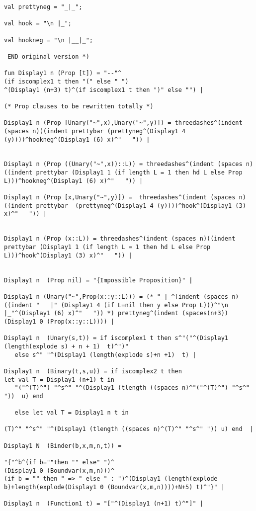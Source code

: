 \documentclass{article}
\begin{document}
{{\begin{verbatim}
val prettyneg = "_|_";

val hook = "\n |_";

val hookneg = "\n |__|_";

 END original version *)

fun Display1 n (Prop [t]) = "--"^
(if iscomplex1 t then "(" else " ")
^(Display1 (n+3) t)^(if iscomplex1 t then ")" else "") |

(* Prop clauses to be rewritten totally *)

Display1 n (Prop [Unary("~",x),Unary("~",y)]) = threedashes^(indent (spaces n)((indent prettybar (prettyneg^(Display1 4 (y))))^hookneg^(Display1 (6) x)^"   ")) |


Display1 n (Prop ((Unary("~",x))::L)) = threedashes^(indent (spaces n)((indent prettybar (Display1 1 (if length L = 1 then hd L else Prop L)))^hookneg^(Display1 (6) x)^"   ")) |

Display1 n (Prop [x,Unary("~",y)]) =  threedashes^(indent (spaces n)((indent prettybar  (prettyneg^(Display1 4 (y))))^hook^(Display1 (3) x)^"   ")) |


Display1 n (Prop (x::L)) = threedashes^(indent (spaces n)((indent prettybar (Display1 1 (if length L = 1 then hd L else Prop L)))^hook^(Display1 (3) x)^"   ")) |


Display1 n  (Prop nil) = "{Impossible Proposition}" |

Display1 n (Unary("~",Prop(x::y::L))) = (* "_|_^(indent (spaces n)((indent "   |" (Display1 4 (if L=nil then y else Prop L)))^"\n   |_"^(Display1 (6) x)^"   ")) *) prettyneg^(indent (spaces(n+3)) (Display1 0 (Prop(x::y::L)))) |

Display1 n  (Unary(s,t)) = if iscomplex1 t then s^"("^(Display1 (length(explode s) + n + 1)  t)^")"
   else s^" "^(Display1 (length(explode s)+n +1)  t) |

Display1 n  (Binary(t,s,u)) = if iscomplex2 t then
let val T = Display1 (n+1) t in
   "("^(T)^") "^s^" "^(Display1 (tlength ((spaces n)^"("^(T)^") "^s^" "))  u) end

   else let val T = Display1 n t in

(T)^" "^s^" "^(Display1 (tlength ((spaces n)^(T)^" "^s^" ")) u) end  |

Display1 N  (Binder(b,x,m,n,t)) =

"{"^b^(if b=""then "" else" ")^
(Display1 0 (Boundvar(x,m,n)))^
(if b = "" then " => " else " : ")^(Display1 (length(explode b)+length(explode(Display1 0 (Boundvar(x,m,n))))+N+5) t)^"}" |

Display1 n  (Function1 t) = "["^(Display1 (n+1) t)^"]" |


\end{verbatim}}}
\end{document}
